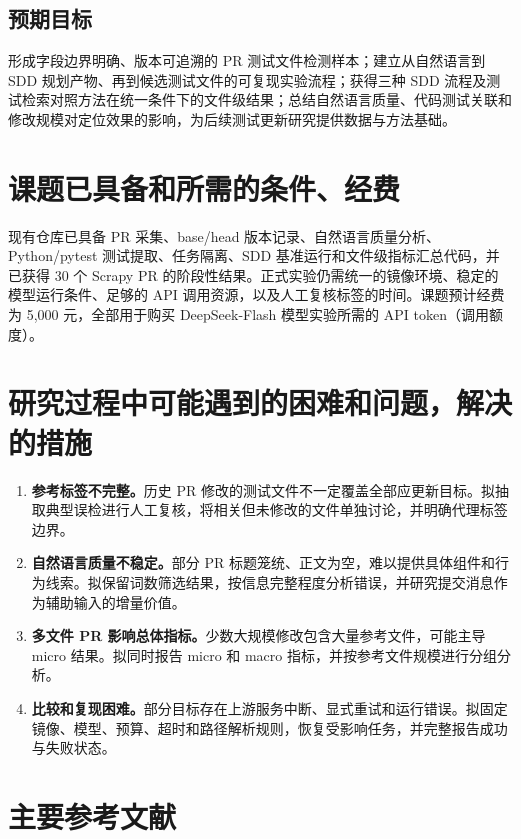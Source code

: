 \subsection{预期目标}

形成字段边界明确、版本可追溯的 PR 测试文件检测样本；建立从自然语言到 SDD 规划产物、再到候选测试文件的可复现实验流程；获得三种 SDD 流程及测试检索对照方法在统一条件下的文件级结果；总结自然语言质量、代码测试关联和修改规模对定位效果的影响，为后续测试更新研究提供数据与方法基础。

\section{课题已具备和所需的条件、经费}

现有仓库已具备 PR 采集、base/head 版本记录、自然语言质量分析、Python/pytest 测试提取、任务隔离、SDD 基准运行和文件级指标汇总代码，并已获得 30 个 Scrapy PR 的阶段性结果。正式实验仍需统一的镜像环境、稳定的模型运行条件、足够的 API 调用资源，以及人工复核标签的时间。课题预计经费为 5,000 元，全部用于购买 DeepSeek-Flash 模型实验所需的 API token（调用额度）。

\section{研究过程中可能遇到的困难和问题，解决的措施}

\begin{enumerate}
  \item \textbf{参考标签不完整。}历史 PR 修改的测试文件不一定覆盖全部应更新目标。拟抽取典型误检进行人工复核，将相关但未修改的文件单独讨论，并明确代理标签边界。
  \item \textbf{自然语言质量不稳定。}部分 PR 标题笼统、正文为空，难以提供具体组件和行为线索。拟保留词数筛选结果，按信息完整程度分析错误，并研究提交消息作为辅助输入的增量价值。
  \item \textbf{多文件 PR 影响总体指标。}少数大规模修改包含大量参考文件，可能主导 micro 结果。拟同时报告 micro 和 macro 指标，并按参考文件规模进行分组分析。
  \item \textbf{比较和复现困难。}部分目标存在上游服务中断、显式重试和运行错误。拟固定镜像、模型、预算、超时和路径解析规则，恢复受影响任务，并完整报告成功与失败状态。
\end{enumerate}

\section{主要参考文献}

\nocite{fatima2024flakyfix,guo2022unixcoder,jang2025unitcon,liu2025cote,alshahwan2024testgenllm,schaefer2024empirical}



